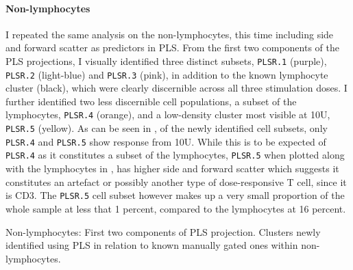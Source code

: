 \paragraph{Non-lymphocytes} 
I repeated the same analysis on the non-lymphocytes, this time including side and forward scatter as predictors in \gls{PLS}.
From the first two components of the \gls{PLS} projections, I visually identified three distinct subsets, \texttt{PLSR.1} (purple), \texttt{PLSR.2} (light-blue) and \texttt{PLSR.3} (pink),
in addition to the known lymphocyte cluster (black), which were clearly discernible across all three stimulation doses.
I further identified two less discernible cell populations, a subset of the lymphocytes, \texttt{PLSR.4} (orange), and a low-density cluster most visible at 10U, \texttt{PLSR.5} (yellow).
As can be seen in , of the newly identified cell subsets, only \texttt{PLSR.4} and \texttt{PLSR.5} show response from 10U.
While this is to be expected of \texttt{PLSR.4} as it constitutes a subset of the lymphocytes, \texttt{PLSR.5} when plotted along with the lymphocytes in , has higher side and forward scatter which suggests it constitutes an artefact or possibly another type of dose-responsive T cell, since it is CD3\positive.
The \texttt{PLSR.5} cell subset however makes up a very small proportion of the whole sample at less that 1 percent, compared to the lymphocytes at 16 percent.  


{ Non-lymphocytes: First two components of \gls{PLS} projection.  Clusters newly identified using \gls{PLS} in relation to known manually gated ones within non-lymphocytes. }
{ } 


